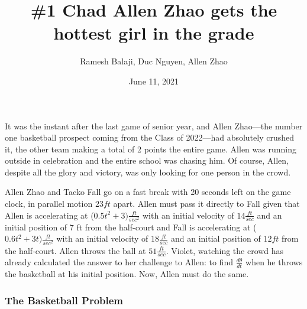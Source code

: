 \documentclass[xcolor={usenames, dvipsnames}]{beamer}
\title{\#1 Chad Allen Zhao gets the hottest girl in the grade}
\author{Ramesh Balaji, Duc Nguyen, Allen Zhao}
\date{June 11, 2021}
\begin{document}
\frame{\titlepage}

\begin{frame}
	It was the instant after the last game of senior year, and Allen Zhao—the number one basketball prospect coming from the Class of 2022—had absolutely crushed it, the other team making a total of 2 points the entire game. Allen was running outside in celebration and the entire school was chasing him. Of course, Allen, despite all the glory and victory, was only looking for one person in the crowd.
\end{frame}

\begin{frame}

    Allen Zhao and Tacko Fall go on a fast break with 20 seconds left on the game clock, in parallel
    motion $23 ft$ apart. 
Allen must pass it directly to Fall given that Allen is accelerating at ($0.5t^2+3)\frac{ft}{sec^2}$
with an initial velocity of $14 \frac{ft}{sec}$ and an initial position of 7 ft from the half-court and Fall is accelerating at ($0.6t^2+3t) \frac{ft}{sec^2}$
with an initial velocity of $18 \frac{ft}{sec}$ and an initial position of $12ft$ from the half-court. Allen throws the ball at 
$51 \frac{ft}{sec}$. Violet, watching the crowd has already calculated the answer to 
her challenge to Allen: to find $\frac{d\theta}{dt}$ when he throws the basketball at his
initial position. Now, Allen must do the same. 

\end{frame}

\begin{frame}
\frametitle{The Basketball Problem}

\begin{center}


\end{center}

\end{frame}
\end{document}
